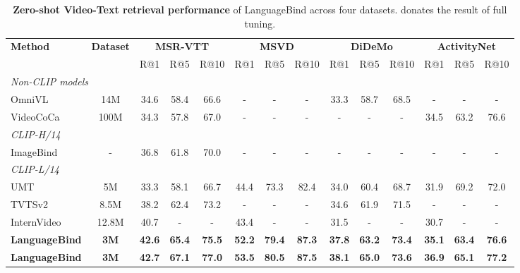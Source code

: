 \documentclass{article} \usepackage{iclr2024_conference,times}
\begin{document}
\begin{table*}[htbp]
\small
\caption{\textbf{Zero-shot Video-Text retrieval performance} of LanguageBind across four datasets.  donates the result of full tuning.
}
\label{tab:retrieval_languagebind}
\centering
\setlength\tabcolsep{0.8mm}
\begin{tabular}{lc|ccc|ccc|ccc|ccc}
        \toprule
        \multirow{2}{*}{\bf{Method}} & \multirow{2}{*}{\bf{Dataset}} & \multicolumn{3}{c}{\bf{MSR-VTT}} & \multicolumn{3}{c}{\bf{MSVD}} & \multicolumn{3}{c}{\bf{DiDeMo}} & \multicolumn{3}{c}{\bf{ActivityNet}} \\
         &  & R@1 & R@5 & R@10 & R@1 & R@5 & R@10 & R@1 & R@5 & R@10 & R@1 & R@5 & R@10 \\
        \midrule
        \multicolumn{14}{l}{\textit{Non-CLIP models}} \\
OmniVL & 14M & 34.6 & 58.4 & 66.6 & - & - & - & 33.3 & 58.7 & 68.5 & - & - & - \\
VideoCoCa & 100M & 34.3 & 57.8 & 67.0 & - & - & - & - & - & - & 34.5 & 63.2 & 76.6 \\
        \midrule
        \multicolumn{14}{l}{\textit{CLIP-H/14}} \\
        ImageBind & - & 36.8 & 61.8 & 70.0 & - & - & - & - & - & - & - & - & - \\
        \midrule
        \multicolumn{14}{l}{\textit{CLIP-L/14}} \\
        UMT & 5M & 33.3 & 58.1 & 66.7 & 44.4 & 73.3 & 82.4 & 34.0 & 60.4 & 68.7 & 31.9 & 69.2 & 72.0 \\
        TVTSv2 & 8.5M & 38.2 & 62.4 & 73.2 & - & - & - & 34.6 & 61.9 & 71.5 & - & - & - \\
        InternVideo & 12.8M & 40.7 & - & - & 43.4 & - & - & 31.5 & - & - & 30.7 & - & - \\
        \bf{LanguageBind} & \bf{3M} & \bf{42.6} & \bf{65.4} & \bf{75.5} & \bf{52.2} & \bf{79.4} & \bf{87.3} & \bf{37.8} & \bf{63.2} & \bf{73.4} & \bf{35.1} & \bf{63.4} & \bf{76.6} \\
        \bf{LanguageBind} & \bf{3M} & \bf{42.7} & \bf{67.1} & \bf{77.0} & \bf{53.5} & \bf{80.5} & \bf{87.5} & \bf{38.1} & \bf{65.0} & \bf{73.6} & \bf{36.9} & \bf{65.1} & \bf{77.2} \\
        
      \bottomrule
      \end{tabular}
\end{table*} 
\end{document}
